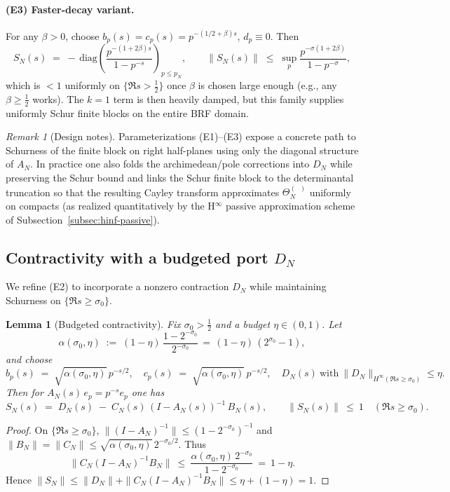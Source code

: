 \documentclass[11pt]{article}
\newtheorem{lemma}[theorem]{Lemma}
\theoremstyle{definition}
\theoremstyle{remark}
\newtheorem{remark}[theorem]{Remark}
\DeclareMathOperator{\dettwo}{det_2}
\begin{document}
\paragraph{(E3) Faster-decay variant.}
For any $\beta>0$, choose $b_p(s)=c_p(s)=p^{-(1/2+\beta)s}$, $d_p\equiv 0$. Then
\[
 S_N(s)\;=\;-\,\mathrm{diag}\!\left(\frac{p^{-(1+2\beta)s}}{1-p^{-s}}\right)_{p\le p_N},\qquad \|S_N(s)\|\;\le\;\sup_p\frac{p^{-\sigma(1+2\beta)}}{1-p^{-\sigma}},
\]
which is $<1$ uniformly on $\{\Re s>\tfrac12\}$ once $\beta$ is chosen large enough (e.g., any $\beta\ge \tfrac12$ works). The $k=1$ term is then heavily damped, but this family supplies uniformly Schur finite blocks on the entire BRF domain.
\begin{remark}[Design notes]
Parameterizations (E1)–(E3) expose a concrete path to Schurness of the finite block on right half-planes using only the diagonal structure of $A_N$. In practice one also folds the archimedean/pole corrections into $D_N$ while preserving the Schur bound and links the Schur finite block to the determinantal truncation so that the resulting Cayley transform approximates $\Theta_N^{(\dettwo)}$ uniformly on compacts (as realized quantitatively by the H$^\infty$ passive approximation scheme of Subsection~\ref{subsec:hinf-passive}).
\end{remark}

\subsection{Contractivity with a budgeted port $D_N$}\label{subsec:DN-budget}
We refine (E2) to incorporate a nonzero contraction $D_N$ while maintaining Schurness on $\{\Re s\ge \sigma_0\}$.

\begin{lemma}[Budgeted contractivity]\label{lem:budget}
Fix $\sigma_0>\tfrac12$ and a budget $\eta\in(0,1)$. Let
\[
 \alpha(\sigma_0,\eta)\;:=\;(1-\eta)\,\frac{1-2^{-\sigma_0}}{2^{-\sigma_0}}\,=\,(1-\eta)\,(2^{\sigma_0}-1),
\]
and choose
\[
 b_p(s)\;=\;\sqrt{\alpha(\sigma_0,\eta)}\,p^{-s/2},\quad c_p(s)\;=\;\sqrt{\alpha(\sigma_0,\eta)}\,p^{-s/2},\quad D_N(s)\ \text{with}\ \|D_N\|_{H^\infty(\Re s\ge \sigma_0)}\le \eta.
\]
Then for $A_N(s)\,e_p=p^{-s}e_p$ one has
\[
 S_N(s)\;=\;D_N(s)\; -\; C_N(s)\,(I-A_N(s))^{-1}\,B_N(s),\qquad \|S_N(s)\|\ \le\ 1\quad (\Re s\ge \sigma_0).
\]
\end{lemma}
\begin{proof}
On $\{\Re s\ge \sigma_0\}$, $\|(I-A_N)^{-1}\|\le (1-2^{-\sigma_0})^{-1}$ and $\|B_N\|=\|C_N\|\le \sqrt{\alpha(\sigma_0,\eta)}\,2^{-\sigma_0/2}$. Thus
\[
 \|C_N(I-A_N)^{-1}B_N\|\ \le\ \frac{\alpha(\sigma_0,\eta)\,2^{-\sigma_0}}{1-2^{-\sigma_0}}\ =\ 1-\eta.
\]
Hence $\|S_N\|\le \|D_N\|+\|C_N(I-A_N)^{-1}B_N\|\le \eta+(1-\eta)=1$.
\end{proof}
\end{document}
